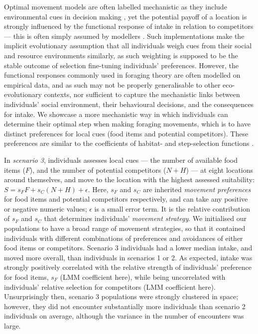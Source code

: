 Optimal movement models are often labelled mechanistic as they include environmental cues in decision making \citep[e.g.][]{scherer2020}, yet the potential payoff of a location is strongly influenced by the functional response of intake in relation to competitors --- this is often simply assumed by modellers \citep[][]{vandermeer1997}.
Such implementations make the implicit evolutionary assumption that all individuals weigh cues from their social and resource environments similarly, as such weighting is supposed to be the stable outcome of selection fine-tuning individuals' preferences.
However, the functional responses commonly used in foraging theory are often modelled on empirical data, and as such may not be properly generalisable to other eco-evolutionary contexts, nor sufficient to capture the mechanistic links between individuals' social environment, their behavioural decisions, and the consequences for intake.
We showcase a more mechanistic way in which individuals can determine their optimal step when making foraging movements, which is to have distinct preferences for local cues (food items and potential competitors).
These preferences are similar to the coefficients of habitat- and step-selection functions \citep[][; see more below]{fortin2005,avgar2013,avgar2016,fieberg2010}.

In \textit{scenario 3}, individuals assesses local cues --- the number of available food items ($F$), and the number of potential competitors ($N + H$) --- at eight locations around themselves, and move to the location with the highest assessed suitability: $S = s_FF + s_C(N + H) + \epsilon$.
Here, $s_F$ and $s_C$ are inherited \textit{movement preferences} for food items and potential competitors respectively, and can take any positive or negative numeric values; $\epsilon$ is a small error term.
It is the relative contribution of $s_F$ and $s_C$ that determines individuals' \textit{movement strategy}.
We initialised our populations to have a broad range of movement strategies, so that it contained individuals with different combinations of preferences and avoidances of either food items or competitors.
Scenario 3 individuals had a lower median intake, and moved more overall, than individuals in scenarios 1 or 2.
As expected, intake was strongly positively correlated with the relative strength of individuals' preference for food items, $s_F$ (LMM coefficient here), while being uncorrelated with individuals' relative selection for competitors (LMM coefficient here).
Unsurprisingly then, scenario 3 populations were strongly clustered in space; however, they did not encounter substantially more individuals than scenario 2 individuals on average, although the variance in the number of encounters was large.

